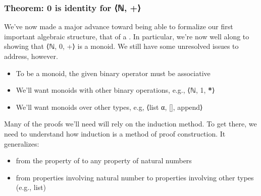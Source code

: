 \documentclass[letterpaper,10pt,english]{sphinxmanual}
\begin{document}
\subsubsection{Theorem: 0 is identity for ⟨ℕ, +⟩}
\label{\detokenize{A_03_Recursive_Types:theorem-0-is-identity-for}}
\begin{sphinxVerbatim}[commandchars=\\\{\}]
 
 

  
     
         
         
 
  
  
\end{sphinxVerbatim}

\sphinxAtStartPar
We’ve now made a major advance toward being able to formalize
our first important algebraic structure, that of a .
In particular, we’re now well along to showing that ⟨ℕ, 0, +⟩
is a monoid. We still have some unresolved issues to address,
however.
\begin{itemize}
\item {} 
\sphinxAtStartPar
To be a monoid, the given binary operator must be associative

\item {} 
\sphinxAtStartPar
We’ll want monoids with other binary operations, e.g., ⟨ℕ, 1, {\color{red}\bfseries{}*}⟩

\item {} 
\sphinxAtStartPar
We’ll want monoids over other types, e.g, ⟨list α, {[}{]}, append⟩

\end{itemize}

\sphinxAtStartPar
Many of the proofs we’ll need will rely on the induction method.
To get there, we need to understand how induction is a 
method of proof construction. It generalizes:
\begin{itemize}
\item {} 
\sphinxAtStartPar
from the property of  to any property of natural numbers

\item {} 
\sphinxAtStartPar
from properties involving natural number to properties involving other types (e.g., list)

\end{itemize}
\end{document}
